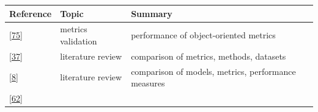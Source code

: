 \documentclass[]{book}
\begin{document}
\begin{longtable}[]{@{}lll@{}}
\toprule
\begin{minipage}[b]{0.23\columnwidth}\raggedright\strut
Reference\strut
\end{minipage} & \begin{minipage}[b]{0.18\columnwidth}\raggedright\strut
Topic\strut
\end{minipage} & \begin{minipage}[b]{0.50\columnwidth}\raggedright\strut
Summary\strut
\end{minipage}\tabularnewline
\midrule
\endhead
\begin{minipage}[t]{0.23\columnwidth}\raggedright\strut
{[}\protect\hyperlink{ref-Gyimothy2005}{75}{]}\strut
\end{minipage} & \begin{minipage}[t]{0.18\columnwidth}\raggedright\strut
metrics validation\strut
\end{minipage} & \begin{minipage}[t]{0.50\columnwidth}\raggedright\strut
performance of object-oriented metrics\strut
\end{minipage}\tabularnewline
\begin{minipage}[t]{0.23\columnwidth}\raggedright\strut
{[}\protect\hyperlink{ref-Catal2009review}{37}{]}\strut
\end{minipage} & \begin{minipage}[t]{0.18\columnwidth}\raggedright\strut
literature review\strut
\end{minipage} & \begin{minipage}[t]{0.50\columnwidth}\raggedright\strut
comparison of metrics, methods, datasets\strut
\end{minipage}\tabularnewline
\begin{minipage}[t]{0.23\columnwidth}\raggedright\strut
{[}\protect\hyperlink{ref-Arisholm2010}{8}{]}\strut
\end{minipage} & \begin{minipage}[t]{0.18\columnwidth}\raggedright\strut
literature review\strut
\end{minipage} & \begin{minipage}[t]{0.50\columnwidth}\raggedright\strut
comparison of models, metrics, performance measures\strut
\end{minipage}\tabularnewline
\begin{minipage}[t]{0.23\columnwidth}\raggedright\strut
{[}\protect\hyperlink{ref-DAmbros2010}{62}{]}\strut
\end{minipage} & \begin{minipage}[t]{0.18\columnwidth}\raggedright\strut

\end{minipage}
\end{longtable}
\end{document}

